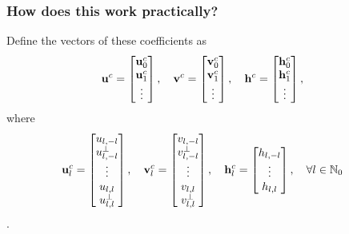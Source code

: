 \documentclass[10pt]{beamer}
\newcommand{\No}{\mathbb{N}_0}
\begin{document}
\frame
{
    \frametitle{How does this work practically?}

Define the vectors of these coefficients as 
\begin{align}
\bold{u}^c &= \begin{bmatrix}
			\bold{u}_0^c \\
			\bold{u}_1^c \\
			\vdots \\
		    \end{bmatrix},
\quad
\bold{v}^c = \begin{bmatrix}
			\bold{v}_0^c \\
			\bold{v}_1^c \\
			\vdots \\
		    \end{bmatrix},
\quad
\bold{h}^c = \begin{bmatrix}
			\bold{h}_0^c \\
			\bold{h}_1^c \\
			\vdots \\
		    \end{bmatrix},		  
\end{align}
where
\begin{align}
\bold{u}^c_l &= \begin{bmatrix}
				u_{l,-l} \\
				u^{\perp}_{l,-l} \\
				\vdots \\
				u_{l,l} \\
				u^{\perp}_{l,l}
		        \end{bmatrix},
\quad
\bold{v}^c_l = \begin{bmatrix}
				v_{l,-l} \\
				v^{\perp}_{l,-l} \\
				\vdots \\
				v_{l,l} \\
				v^{\perp}_{l,l}
		        \end{bmatrix},
\quad
\bold{h}^c_l = \begin{bmatrix}
				h_{l,-l} \\
				\vdots \\
				h_{l,l} \\
		        \end{bmatrix},
\quad \forall l \in \No	  
\end{align}.

}
\end{document}
